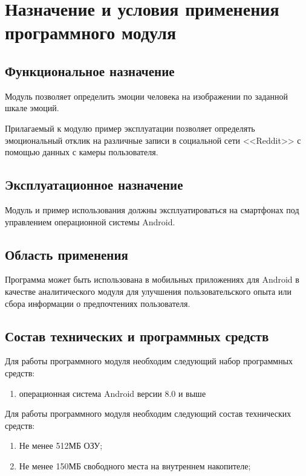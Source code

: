 \documentclass[a4paper,12pt]{article}
\begin{document}
    \newpage

    \thirdPage

    \newpage

    \section{Назначение и условия применения программного модуля}
    \subsection{Функциональное назначение}
    Модуль позволяет определить эмоции человека на изображении по заданной шкале эмоций.

    Прилагаемый к модулю пример эксплуатации позволяет определять эмоциональный отклик на различные записи в социальной сети <<Reddit>> с помощью данных с камеры пользователя.

    \subsection{Эксплуатационное назначение}
    Модуль и пример использования должны эксплуатироваться на смартфонах под управлением операционной системы Android.

    \subsection{Область применения}
    Программа может быть использована в мобильных приложениях для Android в качестве аналитического модуля для улучшения пользовательского опыта или сбора информации о предпочтениях пользователя.

    \subsection{Состав технических и программных средств}
    Для работы программного модуля необходим следующий набор программных средств:
    \begin{enumerate}
        \item операционная система Android версии 8.0 и выше
    \end{enumerate}

    Для работы программного модуля необходим следующий состав технических средств:
    \begin{enumerate}
        \item Не менее 512МБ ОЗУ;
        \item Не менее 150МБ свободного места на внутреннем накопителе;
    \end{enumerate}
\end{document}
